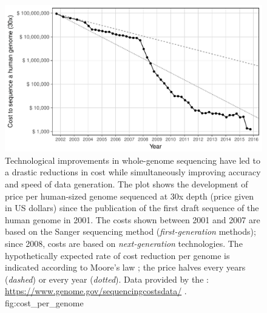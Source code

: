 

\begin{figure}[!htb]
\includegraphics[width=\textwidth]{./img/ch1/cost_per_genome}
{Technological improvements in whole-genome sequencing have led to a drastic reductions in cost while simultaneously improving accuracy and speed of data generation.
The plot shows the development of price per human-sized genome sequenced at 30x depth (price given in US dollars) since the publication of the first draft sequence of the human genome in 2001.
The costs shown between 2001 and 2007 are based on the Sanger sequencing method (\emph{first-generation} methods); since 2008, costs are based on \emph{next-generation} technologies.
The hypothetically expected rate of cost reduction per genome is indicated according to Moore's law \citep{moore1965}; the price halves every  years (\emph{dashed}) or every year (\emph{dotted}).
Data provided by the : \url{https://www.genome.gov/sequencingcostsdata/} .}
{fig:cost_per_genome}
\end{figure}
